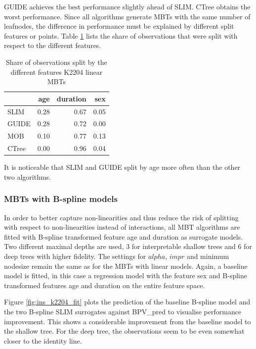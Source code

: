 GUIDE achieves the best performance slightly ahead of SLIM. CTree obtains the worst performance.
Since all algorithms generate MBTs with the same number of leafnodes, the difference in performance must be explained by different split features or points.
Table \ref{tab:ins_k2204_lm_surrogates_share} lists the share of observations that were split with respect to the different features.

\begin{table}[!htb]

\caption{Share of observations split by the different features K2204 linear MBTs}
\centering \scriptsize
\begin{tabular}[t]{l|r|r|r}
\hline
& age & duration & sex\\
\hline
SLIM & 0.28 & 0.67 & 0.05\\
GUIDE & 0.28 & 0.72 & 0.00\\
MOB & 0.10 & 0.77 & 0.13\\
CTree & 0.00 & 0.96 & 0.04\\
\hline
\end{tabular}
\label{tab:ins_k2204_lm_surrogates_share}
\end{table}

It is noticeable that SLIM and GUIDE split by age more often than the other two algorithms.

\subsubsection{MBTs with B-spline models}

In order to better capture non-linearities and thus reduce the risk of splitting with respect to non-linearities instead of interactions, all MBT algorithms are fitted with B-spline transformed feature age and duration as surrogate models. 
Two different maximal depths are used, 3 for interpretable shallow trees and 6 for deep trees with higher fidelity. The settings for $alpha$, $impr$ and minimum nodesize remain the same as for the MBTs with linear models.  Again, a baseline model is fitted, in this case a regression model with the feature sex and B-spline transformed features age and duration on the entire feature space. 

Figure \ref{fig:ins_k2204_fit} plots the prediction of the baseline B-spline model and the two B-spline SLIM surrogates against BPV\_pred to visualise performance improvement. This shows a considerable improvement from the baseline model to the shallow tree. For the deep tree, the observations seem to be even somewhat closer to the identity line. 

